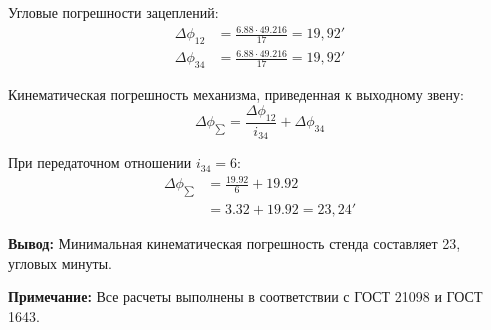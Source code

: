 Угловые погрешности зацеплений:
\begin{align*}
\Delta \phi_{12} &= \frac{6.88 \cdot 49.216}{17} = 19,\!92' \\
\Delta \phi_{34} &= \frac{6.88 \cdot 49.216}{17} = 19,\!92'
\end{align*}

Кинематическая погрешность механизма, приведенная к выходному звену:
\begin{equation}
\Delta \phi_{\sum} = \frac{\Delta \phi_{12}}{i_{34}} + \Delta \phi_{34}
\end{equation}

\noindent При передаточном отношении $i_{34} = 6$:
\begin{align*}
\Delta \phi_{\sum} &= \frac{19.92}{6} + 19.92 \\
&= 3.32 + 19.92 = 23,\!24'
\end{align*}

\noindent \textbf{Вывод:} Минимальная кинематическая погрешность стенда составляет 23, угловых минуты.

 
\textbf{Примечание:} Все расчеты выполнены в соответствии с ГОСТ 21098 и ГОСТ 1643. %




